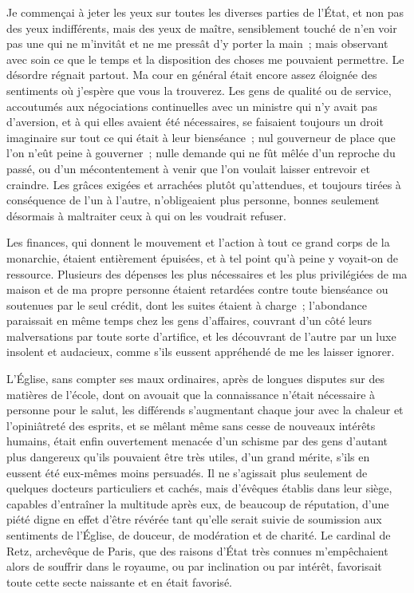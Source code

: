 \documentclass[french,twoside]{book} %
\begin{document}
Je commençai à jeter les yeux sur toutes les diverses parties de l’État, et non pas des yeux indifférents, mais des yeux de maître, sensiblement touché de n’en voir pas une qui ne m’invitât et ne me pressât d’y porter la main ; mais observant avec soin ce que le temps et la disposition des choses me pouvaient permettre. Le désordre régnait partout. Ma cour en général était encore assez éloignée des sentiments où j’espère que vous la trouverez. Les gens de qualité ou de service, accoutumés aux négociations continuelles avec un ministre qui n’y avait pas d’aversion, et à qui elles avaient été nécessaires, se faisaient toujours un droit imaginaire sur tout ce qui était à leur bienséance ; nul gouverneur de place que l’on n’eût peine à gouverner ; nulle demande qui ne fût mêlée d’un reproche du passé, ou d’un mécontentement à venir que l’on voulait laisser entrevoir et craindre. Les grâces exigées et arrachées plutôt qu’attendues, et toujours tirées à conséquence de l’un à l’autre, n’obligeaient plus personne, bonnes seulement désormais à maltraiter ceux à qui on les voudrait refuser.\par
Les finances, qui donnent le mouvement et l’action à tout ce grand corps de la monarchie, étaient entièrement épuisées, et à tel point qu’à peine y voyait-on de ressource. Plusieurs des dépenses les plus nécessaires et les plus privilégiées de ma maison et de ma propre personne étaient retardées contre toute bienséance ou soutenues par le seul crédit, dont les suites étaient à charge ; l’abondance paraissait en même temps chez les gens d’affaires, couvrant d’un côté leurs malversations par toute sorte d’artifice, et les découvrant de l’autre par un luxe insolent et audacieux, comme s’ils eussent appréhendé de me les laisser ignorer.\par
L’Église, sans compter ses maux ordinaires, après de longues disputes sur des matières de l’école, dont on avouait que la connaissance n’était nécessaire à personne pour le salut, les différends s’augmentant chaque jour avec la chaleur et l’opiniâtreté des esprits, et se mêlant même sans cesse de nouveaux intérêts humains, était enfin ouvertement menacée d’un schisme par des gens d’autant plus dangereux qu’ils pouvaient être très utiles, d’un grand mérite, s’ils en eussent été eux-mêmes moins persuadés. Il ne s’agissait plus seulement de quelques docteurs particuliers et cachés, mais d’évêques établis dans leur siège, capables d’entraîner la multitude après eux, de beaucoup de réputation, d’une piété digne en effet d’être révérée tant qu’elle serait suivie de soumission aux sentiments de l’Église, de douceur, de modération et de charité. Le cardinal de Retz, archevêque de Paris, que des raisons d’État très connues m’empêchaient alors de souffrir dans le royaume, ou par inclination ou par intérêt, favorisait toute cette secte naissante et en était favorisé.\par
\end{document}
